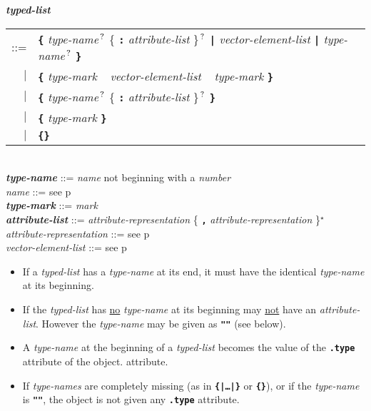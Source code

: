 \documentclass[12pt]{article}
\newcommand{\TT}[1]{{\tt \bfseries #1}}
\newcommand{\emkey}[1]{{\em \bfseries #1}}
\newcommand{\ttdkey}[1]{{\tt \bfseries .#1}}
\newcommand{\pagref}[1]{p\pageref{#1}}
\newcommand{\STAR}{{\Large $^\star$}}
\newcommand{\QMARK}{{$^{\,\mbox{\footnotesize ?}}$}}
\newenvironment{indpar}[1][0.3in]%
	{\begin{list}{}%
		     {\setlength{\itemsep}{0in}%
		      \setlength{\topsep}{0in}%
		      \setlength{\parsep}{1ex}%
		      \setlength{\labelwidth}{#1}%
		      \setlength{\leftmargin}{#1}%
		      \addtolength{\leftmargin}{\labelsep}}%
	 \item}%
	{\end{list}}
\begin{document}
\begin{indpar}[0.2in]

\emkey{typed-list}\label{TYPED-LIST}
	\begin{tabular}[t]{@{}rl@{}}
        ::= & \TT{\{} {\em type-name}\QMARK{}
	              \{ \TT{:} {\em attribute-list} \}\QMARK{} \TT{|}
	      {\em vector-element-list}
	      \TT{|} {\em type-name}\QMARK{} \TT{\}} \\
	$|$ & \TT{\{} {\em type-mark} ~ {\em vector-element-list}
	                              ~ {\em type-mark} \TT{\}} \\
        $|$ & \TT{\{} {\em type-name}\QMARK{}
	              \{ \TT{:} {\em attribute-list} \}\QMARK{} \TT{\}} \\
	$|$ & \TT{\{} {\em type-mark} \TT{\}} \\
	$|$ & \TT{\{\}}
	\end{tabular}
\\[0.5ex]
\emkey{type-name}\label{TYPE-NAME}
    ::= {\em name} not beginning with a {\em number}
\\
{\em name} ::= see \pagref{NAME}
\\
\emkey{type-mark}\label{TYPE-MARK} ::= {\em mark}
\\[0.5ex]
\emkey{attribute-list}\label{ATTRIBUTE-LIST}
    ::= {\em attribute-representation}
        \{ \TT{,} {\em attribute-representation} \}\STAR{} \\
{\em attribute-representation} ::= see \pagref{ATTRIBUTE-REPRESENTATION}
\\[0.5ex]
{\em vector-element-list} ::= see \pagref{VECTOR-ELEMENT-LIST}


\begin{itemize}

\item If a {\em typed-list} has a {\em type-name} at its end, it must
have the identical {\em type-name} at its beginning.
\item If the {\em typed-list} has \underline{no} {\em type-name}
at its beginning may \underline{not} have an {\em attribute-list}.
However the {\em type-name} may be given as \TT{""} (see below).
\item A {\em type-name} at the beginning of a {\em typed-list}
becomes the value of the
\ttdkey{type} attribute of the object.
attribute.
\item
If {\em type-names} are completely missing
(as in \TT{\{|\ldots|\}} or \TT{\{\}}), or if the {\em type-name}
is \TT{""}, the object is not given any \TT{.type} attribute.


\end{itemize}
\end{indpar}
\end{document}
